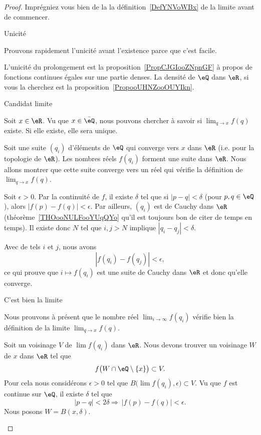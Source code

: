 \begin{proof}
    Imprégniez vous bien de la la définition~\ref{DefYNVoWBx} de la limite avant de commencer.

    \begin{subproof}

    \item[Unicité]

        Prouvons rapidement l'unicité avant l'existence parce que c'est facile.

        L'unicité du prolongement est la proposition~\ref{PropCJGIooZNpnGF} à propos de fonctions continues égales sur une partie denses. La densité de \( \eQ\) dans \( \eR\), si vous la cherchez est la proposition~\ref{PropooUHNZooOUYIkn}.

        \item[Candidat limite]

        Soit \( x\in \eR\). Vu que \( x\in \bar \eQ\), nous pouvons chercher à savoir si \( \lim_{q\to x} f(q) \) existe. Si elle existe, elle sera unique.

        Soit une suite \( (q_i)\) d'éléments de \( \eQ\) qui converge vers \( x\) dans \( \eR\) (i.e. pour la topologie de \( \eR\)). Les nombres réels \( f(q_i)\) forment une suite dans \( \eR\). Nous allons montrer que cette suite converge vers un réel qui vérifie la définition de \( \lim_{q\to x}f(q)\).

        Soit \( \epsilon>0\). Par la continuité de \( f\), il existe \( \delta\) tel que si \( | p-q |<\delta\) (pour \( p,q\in \eQ\)), alors \( | f(p)-f(q) |<\epsilon\). Par ailleurs, \( (q_i)\) est de Cauchy dans \( \eR\) (théorème~\ref{THOooNULFooYUqQYo} qu'il est toujours bon de citer de temps en temps). Il existe donc \( N\) tel que \( i,j>N\) implique \( | q_i-q_j |<\delta\).

        Avec de tels \( i\) et \( j\), nous avons
        \begin{equation}
            | f(q_i)-f(q_j) |<\epsilon,
        \end{equation}
        ce qui prouve que \( i\mapsto f(q_i)\) est une suite de Cauchy dans \( \eR\) et donc qu'elle converge.

    \item[C'est bien la limite]

        Nous prouvons à présent que le nombre réel \( \lim_{i\to \infty} f(q_i)\) vérifie bien la définition de la limite \( \lim_{q\to x}f(q)\).

        Soit un voisinage \( V\) de \( \lim f(q_i)\) dans \( \eR\). Nous devons trouver un voisinage \( W\) de \( x\) dans \( \eR\) tel que
        \begin{equation}
            f\big( W\cap\eQ\setminus\{ x \} \big)\subset V.
        \end{equation}
        Pour cela nous considérons \( \epsilon>0\) tel que \( B\big( \lim f(q_i),\epsilon \big)\subset V\). Vu que \( f\) est continue sur \( \eQ\), il existe \( \delta\) tel que
        \begin{equation}
            | p-q |<2\delta\Rightarrow\,| f(p)-f(q) |<\epsilon.
        \end{equation}
        Nous posons \( W=B(x,\delta)\).


\end{subproof}
\end{proof}
